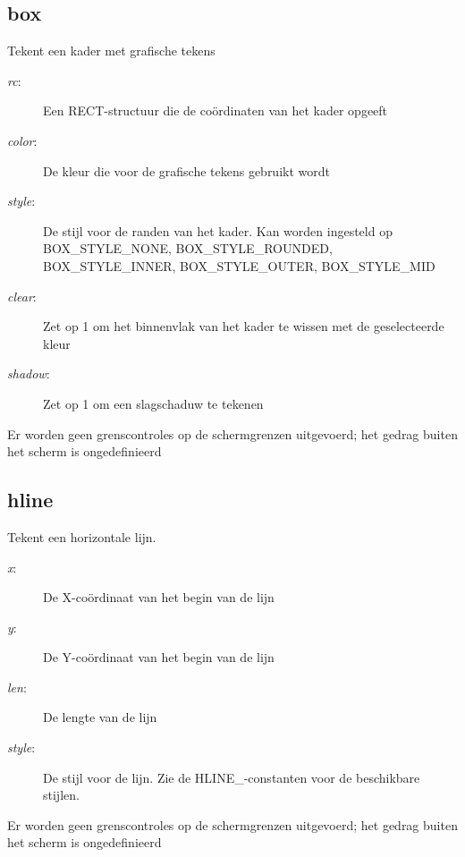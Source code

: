 \subsection{box}
\begin{description}[leftmargin=2.4cm,style=nextline]
\item [Beschrijving:] {Tekent een kader met grafische tekens}\item [Syntaxis:] \item [Parameters:]
\begin{description}
\item [{\em rc}:] {Een RECT-structuur die de coördinaten van het kader opgeeft}\item [{\em color}:] {De kleur die voor de grafische tekens gebruikt wordt}\item [{\em style}:] {De stijl voor de randen van het kader. Kan worden ingesteld op BOX\_STYLE\_NONE, BOX\_STYLE\_ROUNDED, BOX\_STYLE\_INNER, BOX\_STYLE\_OUTER, BOX\_STYLE\_MID}\item [{\em clear}:] {Zet op 1 om het binnenvlak van het kader te wissen met de geselecteerde kleur}\item [{\em shadow}:] {Zet op 1 om een slagschaduw te tekenen}
\end{description}
\item [Opmerkingen:] {Er worden geen grenscontroles op de schermgrenzen uitgevoerd; het gedrag buiten het scherm is ongedefinieerd}
\end{description}

\subsection{hline}
\begin{description}[leftmargin=2.4cm,style=nextline]
\item [Beschrijving:] {Tekent een horizontale lijn.}\item [Syntaxis:] \item [Parameters:]
\begin{description}
\item [{\em x}:] {De X-coördinaat van het begin van de lijn}\item [{\em y}:] {De Y-coördinaat van het begin van de lijn}\item [{\em len}:] {De lengte van de lijn}\item [{\em style}:] {De stijl voor de lijn. Zie de HLINE\_-constanten voor de beschikbare stijlen.}
\end{description}
\item [Opmerkingen:] {Er worden geen grenscontroles op de schermgrenzen uitgevoerd; het gedrag buiten het scherm is ongedefinieerd}
\end{description}

